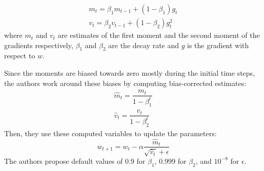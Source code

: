 \begin{subequations}
\begin{gather}
\label{adamfirst}
m_t = \beta_1 m_{t-1} + (1 - \beta_1) g_t \\   
v_t = \beta_2 v_{t-1} + (1 - \beta_2) g_t^2  
\end{gather}
\end{subequations}
where $m_t$ and $v_t$ are estimates of the first moment and the second moment of the gradients respectively, $\beta_1$ and $\beta_2$ are the decay rate and $g$ is the gradient with respect to $w$. 

Since the moments are biased towards zero mostly during the initial time steps, the authors work around these biases by computing bias-corrected estimates:
\begin{subequations}
\begin{gather}
\hat{m}_t=\dfrac{m_t}{1 - \beta^t_1} \\
\hat{v}_t=\dfrac{v_t}{1 - \beta^t_2}
\label{adamend}
\end{gather}
\end{subequations}
Then, they use these computed variables to update the parameters:
\begin{equation}
w_{t+1} = w_{t} - \alpha \dfrac{\hat{m}_t}{\sqrt{\hat{v}_t} + \epsilon} 
\label{adamend2}
\end{equation}
The authors propose default values of 0.9 for $\beta_1$, 0.999 for $\beta_2$, and $10^{-8}$ for $\epsilon$.


